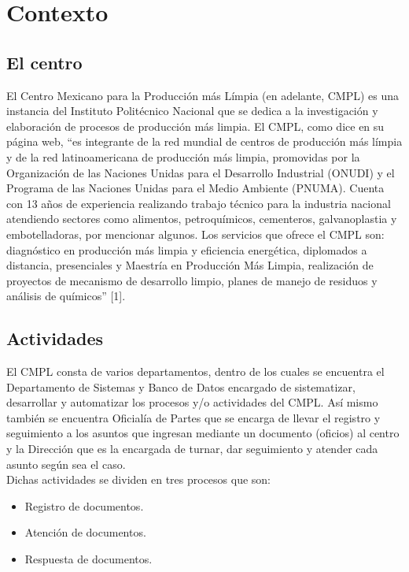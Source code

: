 \section{Contexto}

\subsection{El centro}

El Centro Mexicano para la Producción más Límpia (en adelante, CMPL) es una instancia del Instituto Politécnico Nacional que se dedica a la investigación y elaboración de procesos de producción más limpia. El CMPL, como dice en su página web, “es integrante de la red mundial de centros de producción más límpia y de la red latinoamericana de producción más limpia, promovidas por la Organización de las Naciones Unidas para el Desarrollo Industrial (ONUDI) y el Programa de las Naciones Unidas para el Medio Ambiente (PNUMA). Cuenta con 13 años de experiencia realizando trabajo técnico para la industria nacional atendiendo sectores como alimentos, petroquímicos, cementeros, galvanoplastia y embotelladoras, por mencionar algunos. Los servicios que ofrece el CMPL son: diagnóstico en producción más limpia y eficiencia energética, diplomados a distancia, presenciales y Maestría en Producción Más Limpia, realización de proyectos de mecanismo de desarrollo limpio, planes de manejo de residuos y análisis de químicos” [1].\\

\subsection{Actividades}

El CMPL consta de varios departamentos, dentro de los cuales  se encuentra el Departamento de Sistemas y Banco de Datos encargado de sistematizar, desarrollar y automatizar los procesos y/o actividades del CMPL. Así mismo también se encuentra Oficialía de Partes que se encarga de llevar el registro y seguimiento a los asuntos que ingresan mediante un documento (oficios) al centro y la Dirección que es la encargada de turnar, dar seguimiento y atender cada asunto según sea el caso. \\
Dichas actividades se dividen en tres procesos que son: \\

\begin{itemize}
	\item Registro de documentos.
	\item Atención de documentos.
	\item Respuesta de documentos.
\end{itemize}

